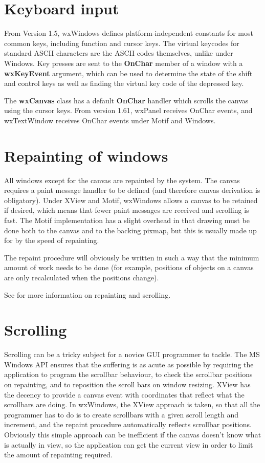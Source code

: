 \section{Keyboard input}

From Version 1.5, wxWindows defines platform-independent constants for
most common keys, including function and cursor keys. The virtual
keycodes for standard ASCII characters are the ASCII codes themselves,
unlike under Windows. Key presses are sent to the {\bf OnChar} member
of a window with a {\bf wxKeyEvent} argument, which can be used to
determine the state of the shift and control keys as well as finding the
virtual key code of the depressed key.

The {\bf wxCanvas} class has a default {\bf OnChar} handler which scrolls
the canvas using the cursor keys. From version 1.61, wxPanel receives
OnChar events, and wxTextWindow receives OnChar events under Motif and
Windows.

\section{Repainting of windows}

All windows except for the canvas are repainted by the system.  The
canvas requires a paint message handler to be defined (and therefore
canvas derivation is obligatory). Under XView and Motif, wxWindows
allows a canvas to be retained if desired, which means that fewer
paint messages are received and scrolling is fast. The Motif implementation
has a slight overhead in that drawing must be done both to the canvas
and to the backing pixmap, but this is usually made up for by the speed
of repainting.

The repaint procedure will obviously be written in such a way that the
minimum amount of work needs to be done (for example, positions of
objects on a canvas are only recalculated when the positions change).

See  for more information on repainting and scrolling.

\section{Scrolling}\label{scrolling}

Scrolling can be a tricky subject for a novice GUI programmer to tackle.
The MS Windows API ensures that the suffering is as acute as possible by
requiring the application to program the scrollbar behaviour, to check
the scrollbar positions on repainting, and to reposition the scroll bars
on window resizing.  XView has the decency to provide a canvas event
with coordinates that reflect what the scrollbars are doing. In
wxWindows, the XView approach is taken, so that all the programmer has
to do is to create scrollbars with a given scroll length and increment,
and the repaint procedure automatically reflects scrollbar positions. 
Obviously this simple approach can be inefficient if the canvas doesn't
know what is actually in view, so the application can get the current
view in order to limit the amount of repainting required.

